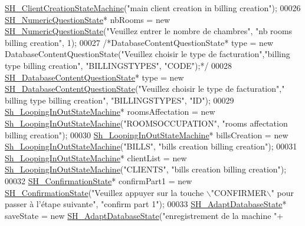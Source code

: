 \begin{DoxyCode}
      \hyperlink{classSH__ClientCreationStateMachine}{SH\_ClientCreationStateMachine}(\textcolor{stringliteral}{"main client creation in billing creation"});
00026     \hyperlink{classSH__NumericQuestionState}{SH\_NumericQuestionState}* nbRooms = \textcolor{keyword}{new} 
      \hyperlink{classSH__NumericQuestionState}{SH\_NumericQuestionState}(\textcolor{stringliteral}{"Veuillez entrer le nombre de chambres"}, \textcolor{stringliteral}{"nb rooms billing
       creation"}, 1);
00027     \textcolor{comment}{/*DatabaseContentQuestionState* type = new DatabaseContentQuestionState("Veuillez choisir le type de
       facturation","billing type billing creation", "BILLINGSTYPES", "CODE");*/}
00028         \hyperlink{classSH__DatabaseContentQuestionState}{SH\_DatabaseContentQuestionState}* type = \textcolor{keyword}{new} 
      \hyperlink{classSH__DatabaseContentQuestionState}{SH\_DatabaseContentQuestionState}(\textcolor{stringliteral}{"Veuillez choisir le type de facturation"},\textcolor{stringliteral}{"
      billing type billing creation"}, \textcolor{stringliteral}{"BILLINGSTYPES"}, \textcolor{stringliteral}{"ID"});
00029     \hyperlink{classSh__LoopingInOutStateMachine}{Sh\_LoopingInOutStateMachine}* roomsAffectation = \textcolor{keyword}{new} 
      \hyperlink{classSh__LoopingInOutStateMachine}{Sh\_LoopingInOutStateMachine}(\textcolor{stringliteral}{"ROOMSOCCUPATION"}, \textcolor{stringliteral}{"rooms affectation billing
       creation"});
00030     \hyperlink{classSh__LoopingInOutStateMachine}{Sh\_LoopingInOutStateMachine}* billsCreation = \textcolor{keyword}{new} 
      \hyperlink{classSh__LoopingInOutStateMachine}{Sh\_LoopingInOutStateMachine}(\textcolor{stringliteral}{"BILLS"}, \textcolor{stringliteral}{"bills creation billing creation"});
00031     \hyperlink{classSh__LoopingInOutStateMachine}{Sh\_LoopingInOutStateMachine}* clientList = \textcolor{keyword}{new} 
      \hyperlink{classSh__LoopingInOutStateMachine}{Sh\_LoopingInOutStateMachine}(\textcolor{stringliteral}{"CLIENTS"}, \textcolor{stringliteral}{"bills creation billing creation"});
00032     \hyperlink{classSH__ConfirmationState}{SH\_ConfirmationState}* confirmPart1 = \textcolor{keyword}{new} 
      \hyperlink{classSH__ConfirmationState}{SH\_ConfirmationState}(\textcolor{stringliteral}{"Veuillez appuyer sur la touche \(\backslash\)"CONFIRMER\(\backslash\)" pour passer à
       l'étape suivante"}, \textcolor{stringliteral}{"confirm part 1"});
00033     \hyperlink{classSH__AdaptDatabaseState}{SH\_AdaptDatabaseState}* saveState = \textcolor{keyword}{new} 
      \hyperlink{classSH__AdaptDatabaseState}{SH\_AdaptDatabaseState}(\textcolor{stringliteral}{"enregistrement de la machine "}+

\end{DoxyCode}
